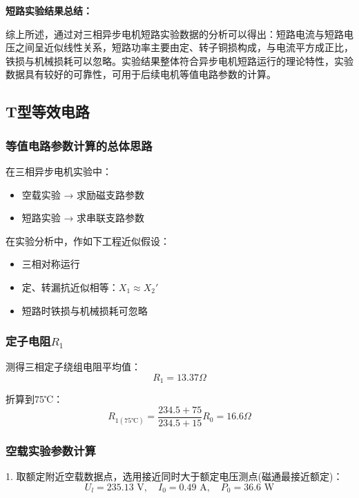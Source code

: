 \documentclass[12pt,a4paper]{article}
\begin{document}
\textbf{短路实验结果总结：}

综上所述，通过对三相异步电机短路实验数据的分析可以得出：短路电流与短路电压之间呈近似线性关系，短路功率主要由定、转子铜损构成，与电流平方成正比，铁损与机械损耗可以忽略。实验结果整体符合异步电机短路运行的理论特性，实验数据具有较好的可靠性，可用于后续电机等值电路参数的计算。

\subsection{T型等效电路}

\subsubsection{等值电路参数计算的总体思路}

在三相异步电机实验中：
\begin{itemize}
\item 空载实验 → 求励磁支路参数
\item 短路实验 → 求串联支路参数
\end{itemize}

在实验分析中，作如下工程近似假设：
\begin{itemize}
\item 三相对称运行
\item 定、转漏抗近似相等：$X_1 \approx X_2'$
\item 短路时铁损与机械损耗可忽略
\end{itemize}

\subsubsection{定子电阻$R_1$}

测得三相定子绕组电阻平均值：
\begin{equation*}
R_1 = 13.37\Omega
\end{equation*}

折算到75℃：
\begin{equation*}
R_{1(75℃)} = \frac{234.5 + 75}{234.5 + 15}R_0 = 16.6\Omega
\end{equation*}

\subsubsection{空载实验参数计算}

1. 取额定附近空载数据点，选用接近同时大于额定电压测点(磁通最接近额定)：
\begin{equation*}
U_l = 235.13\text{ V}, \quad I_0 = 0.49\text{ A}, \quad P_0 = 36.6\text{ W}
\end{equation*}
\end{document}
